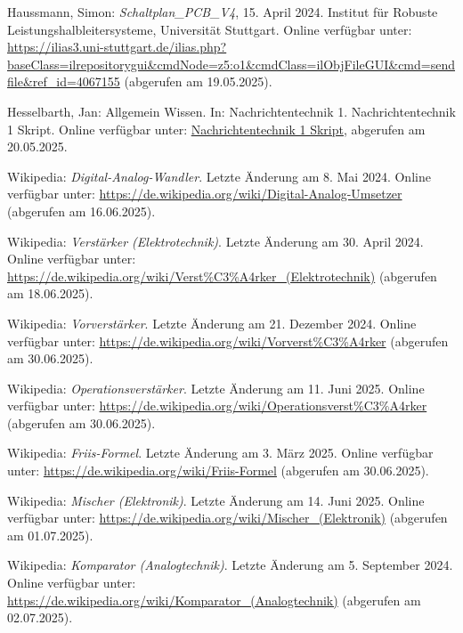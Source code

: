\begin{thebibliography}{1}

Haussmann, Simon: \emph{Schaltplan\_PCB\_V4}, 15. April 2024. Institut für Robuste Leistungshalbleitersysteme, Universität Stuttgart. Online verfügbar unter: \url{https://ilias3.uni-stuttgart.de/ilias.php?baseClass=ilrepositorygui&cmdNode=z5:o1&cmdClass=ilObjFileGUI&cmd=sendfile&ref_id=4067155} (abgerufen am 19.05.2025).

Hesselbarth, Jan: Allgemein Wissen. In: Nachrichtentechnik 1. Nachrichtentechnik 1 Skript. Online verfügbar unter: \url{Nachrichtentechnik 1 Skript}, abgerufen am 20.05.2025.

Wikipedia: \emph{Digital-Analog-Wandler}. Letzte Änderung am 8. Mai 2024.  
Online verfügbar unter: \url{https://de.wikipedia.org/wiki/Digital-Analog-Umsetzer} (abgerufen am 16.06.2025).

Wikipedia: \emph{Verstärker (Elektrotechnik)}. Letzte Änderung am 30. April 2024.  
Online verfügbar unter: \url{https://de.wikipedia.org/wiki/Verst%C3%A4rker_(Elektrotechnik)} (abgerufen am 18.06.2025).

Wikipedia: \emph{Vorverstärker}. Letzte Änderung am 21. Dezember 2024.  
Online verfügbar unter: \url{https://de.wikipedia.org/wiki/Vorverst%C3%A4rker} (abgerufen am 30.06.2025).

Wikipedia: \emph{Operationsverstärker}. Letzte Änderung am 11. Juni 2025.  
Online verfügbar unter: \url{https://de.wikipedia.org/wiki/Operationsverst%C3%A4rker} (abgerufen am 30.06.2025).

Wikipedia: \emph{Friis-Formel}. Letzte Änderung am 3. März 2025.  
Online verfügbar unter: \url{https://de.wikipedia.org/wiki/Friis-Formel} (abgerufen am 30.06.2025).

Wikipedia: \emph{Mischer (Elektronik)}. Letzte Änderung am 14. Juni 2025.  
Online verfügbar unter: \url{https://de.wikipedia.org/wiki/Mischer_(Elektronik)} (abgerufen am 01.07.2025).

Wikipedia: \emph{Komparator (Analogtechnik)}. Letzte Änderung am 5. September 2024.  
Online verfügbar unter: \url{https://de.wikipedia.org/wiki/Komparator_(Analogtechnik)} (abgerufen am 02.07.2025).

\end{thebibliography}

\clearpage
